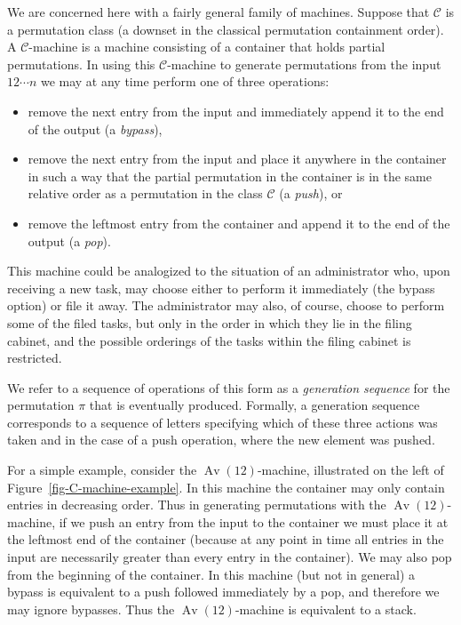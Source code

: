 \documentclass[10pt]{article}
\theoremstyle{plain}
\theoremstyle{definition}
\newcommand{\Av}{\operatorname{Av}}
\newcommand{\C}{\mathcal{C}}
\begin{document}
We are concerned here with a fairly general family of machines. Suppose that $\C$ is a permutation class (a downset in the classical permutation containment order). A $\C$-machine is a machine consisting of a container that holds partial permutations. In using this $\C$-machine to generate permutations from the input $12\cdots n$ we may at any time perform one of three operations:
\begin{itemize}
\item remove the next entry from the input and immediately append it to the end of the output (a \emph{bypass}),
\item remove the next entry from the input and place it anywhere in the container in such a way that the partial permutation in the container is in the same relative order as a permutation in the class $\C$ (a \emph{push}), or
\item remove the leftmost entry from the container and append it to the end of the output (a \emph{pop}).
\end{itemize}
This machine could be analogized to the situation of an administrator who, upon receiving a new task, may choose either to perform it immediately (the bypass option) or file it away. The administrator may also, of course, choose to perform some of the filed tasks, but only in the order in which they lie in the filing cabinet, and the possible orderings of the tasks within the filing cabinet is restricted.

We refer to a sequence of operations of this form as a \emph{generation sequence} for the permutation $\pi$ that is eventually produced. Formally, a generation sequence corresponds to a sequence of letters specifying which of these three actions was taken and in the case of a push operation, where the new element was pushed.

For a simple example, consider the $\Av(12)$-machine, illustrated on the left of Figure~\ref{fig-C-machine-example}. In this machine the container may only contain entries in decreasing order. Thus in generating permutations with the $\Av(12)$-machine, if we push an entry from the input to the container we must place it at the leftmost end of the container (because at any point in time all entries in the input are necessarily greater than every entry in the container). We may also pop from the beginning of the container. In this machine (but not in general) a bypass is equivalent to a push followed immediately by a pop, and therefore we may ignore bypasses. Thus the $\Av(12)$-machine is equivalent to a stack.
\end{document}
